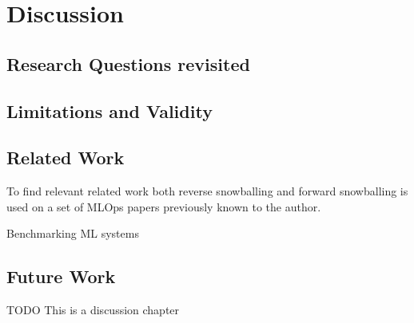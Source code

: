 \chapter{Discussion}
\section{Research Questions revisited}
\section{Limitations and Validity}
\section{Related Work}

To find relevant related work both reverse snowballing and forward snowballing is used on a set of MLOps papers previously known to the author.

Benchmarking ML systems \parencite{cardososilvaBenchmarkingMachineLearning2020}

\section{Future Work}
TODO This is a discussion chapter